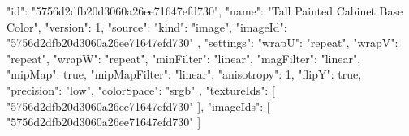 {
  "id": "5756d2dfb20d3060a26ee71647efd730",
  "name": "Tall Painted Cabinet Base Color",
  "version": 1,
  "source": {
    "kind": "image",
    "imageId": "5756d2dfb20d3060a26ee71647efd730"
  },
  "settings": {
    "wrapU": "repeat",
    "wrapV": "repeat",
    "wrapW": "repeat",
    "minFilter": "linear",
    "magFilter": "linear",
    "mipMap": true,
    "mipMapFilter": "linear",
    "anisotropy": 1,
    "flipY": true,
    "precision": "low",
    "colorSpace": "srgb"
  },
  "textureIds": [
    "5756d2dfb20d3060a26ee71647efd730"
  ],
  "imageIds": [
    "5756d2dfb20d3060a26ee71647efd730"
  ]
}
